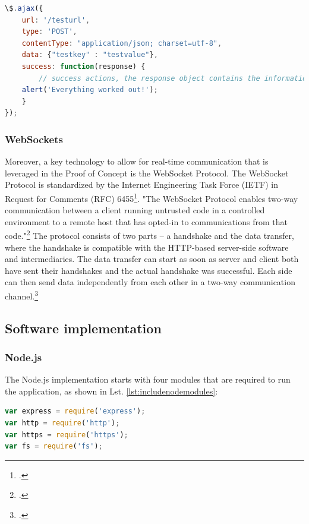 \begin{lstlisting}[language=javascript,caption={Exemplary jQuery AJAX call},label={lst:jqueryajaxcall}]
\$.ajax({
    url: '/testurl',
    type: 'POST',
    contentType: "application/json; charset=utf-8",
    data: {"testkey" : "testvalue"},
    success: function(response) {
        // success actions, the response object contains the information sent from the server
	alert('Everything worked out!');
    }
});
\end{lstlisting}

\subsubsection{WebSockets}
\label{websockets}
Moreover, a key technology to allow for real-time communication that is leveraged
in the Proof of Concept is the WebSocket Protocol. The WebSocket Protocol is standardized
by the Internet Engineering Task Force (IETF) in Request for Comments (RFC)
6455\footcite[Cf.][]{rfc6455}. "The WebSocket Protocol enables two-way
communication between a client running untrusted code in a controlled
environment to a remote host that has opted-in to communications from that
code."\footcite[.][]{rfc6455} The protocol consists of two parts – a handshake
and the data transfer, where the handshake is compatible with the HTTP-based
server-side software and intermediaries. The data transfer can start as
soon as server and client both have sent their handshakes and the actual
handshake was successful. Each side can then send data independently from each
other in a two-way communication channel.\footcite[Cf.][]{rfc6455}



\FloatBarrier
\subsection{Software implementation}
\label{software_implementation}

\subsubsection{Node.js}
\label{implementation_node}
The Node.js implementation starts with four modules that are required to run the application, as shown in Lst. \ref{lst:includenodemodules}:

\begin{lstlisting}[language=javascript,caption={Including modules},label=lst:includenodemodules]
var express = require('express');
var http = require('http');
var https = require('https');
var fs = require('fs');
\end{lstlisting}


